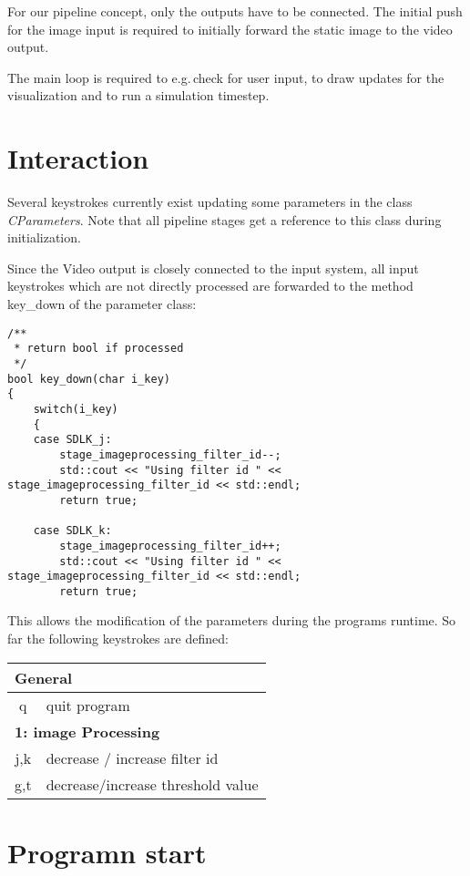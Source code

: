 \documentclass[11pt,a4paper]{article}
\begin{document}
\noindent
For our pipeline concept, only the outputs have to be connected.
The initial push for the image input is required to initially forward the static
image to the video output.

The main loop is required to e.g.\,check for user input, to draw updates for the
visualization and to run a simulation timestep.


\section{Interaction}

Several keystrokes currently exist updating some parameters in the class
\textit{CParameters}.
Note that all pipeline stages get a reference to this class during
initialization.

Since the Video output is closely connected to the input system, all
input keystrokes which are not directly processed are forwarded to the method
key\_down of the parameter class:

\begin{lstlisting}
/**
 * return bool if processed
 */
bool key_down(char i_key)
{
	switch(i_key)
	{
	case SDLK_j:
		stage_imageprocessing_filter_id--;
		std::cout << "Using filter id " << stage_imageprocessing_filter_id << std::endl;
		return true;

	case SDLK_k:
		stage_imageprocessing_filter_id++;
		std::cout << "Using filter id " << stage_imageprocessing_filter_id << std::endl;
		return true;
\end{lstlisting}

\noindent
This allows the modification of the parameters during the programs runtime.
So far the following keystrokes are defined:

\noindent
\begin{tabular}{|c|l|}
	\hline
	\multicolumn{2}{|l|}{\textbf{General}}	\\
	\hline
	q & quit program	\\
	\hline
	\hline

	\multicolumn{2}{|l|}{\textbf{1: image Processing}}	\\
	\hline
	j,k & decrease / increase filter id\\
	\hline
	g,t & decrease/increase threshold value\\
	\hline
\end{tabular}


\section{Programn start}
\end{document}
